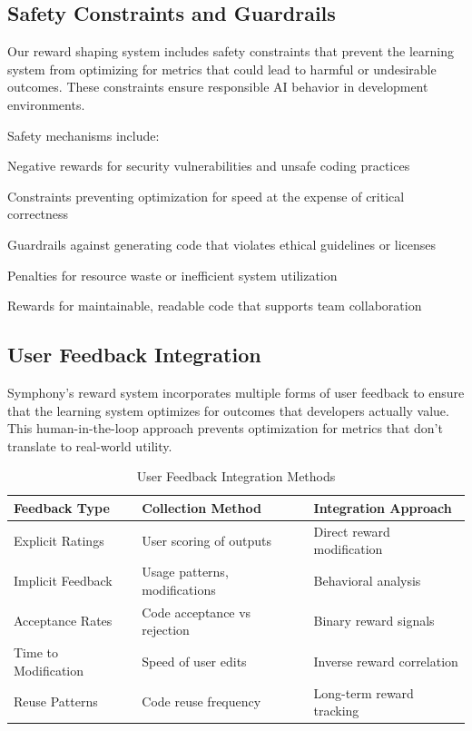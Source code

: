 \subsection*{Safety Constraints and Guardrails}

Our reward shaping system includes safety constraints that prevent the learning system from optimizing for metrics that could lead to harmful or undesirable outcomes. These constraints ensure responsible AI behavior in development environments.

Safety mechanisms include:

\begin{compactlist}
    \item Negative rewards for security vulnerabilities and unsafe coding practices
    \item Constraints preventing optimization for speed at the expense of critical correctness
    \item Guardrails against generating code that violates ethical guidelines or licenses
    \item Penalties for resource waste or inefficient system utilization
    \item Rewards for maintainable, readable code that supports team collaboration
\end{compactlist}

\subsection*{User Feedback Integration}

Symphony's reward system incorporates multiple forms of user feedback to ensure that the learning system optimizes for outcomes that developers actually value. This human-in-the-loop approach prevents optimization for metrics that don't translate to real-world utility.

\begin{table}[ht]
\centering
\begin{tabular}{@{}lll@{}}
\toprule
\textbf{Feedback Type} & \textbf{Collection Method} & \textbf{Integration Approach} \\
\midrule
Explicit Ratings & User scoring of outputs & Direct reward modification \\
Implicit Feedback & Usage patterns, modifications & Behavioral analysis \\
Acceptance Rates & Code acceptance vs rejection & Binary reward signals \\
Time to Modification & Speed of user edits & Inverse reward correlation \\
Reuse Patterns & Code reuse frequency & Long-term reward tracking \\
\bottomrule
\end{tabular}
\caption{User Feedback Integration Methods}
\end{table}

